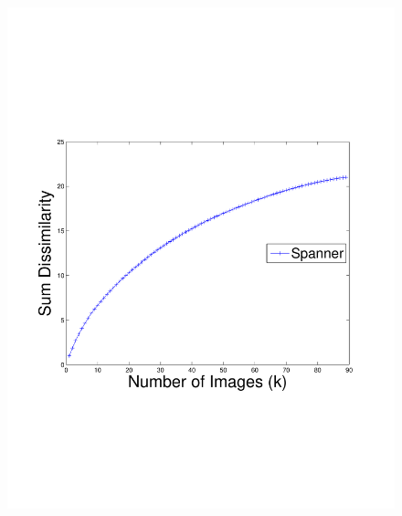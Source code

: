 \begin{figure}[t!]
{        \includegraphics[clip=true, trim = 17mm 65mm 25mm 70mm, scale=0.23]{figures/spanner/spannerCumulativeDist_color.pdf}
        \label{fig:spanSumDissim}
        }
\end{figure}
